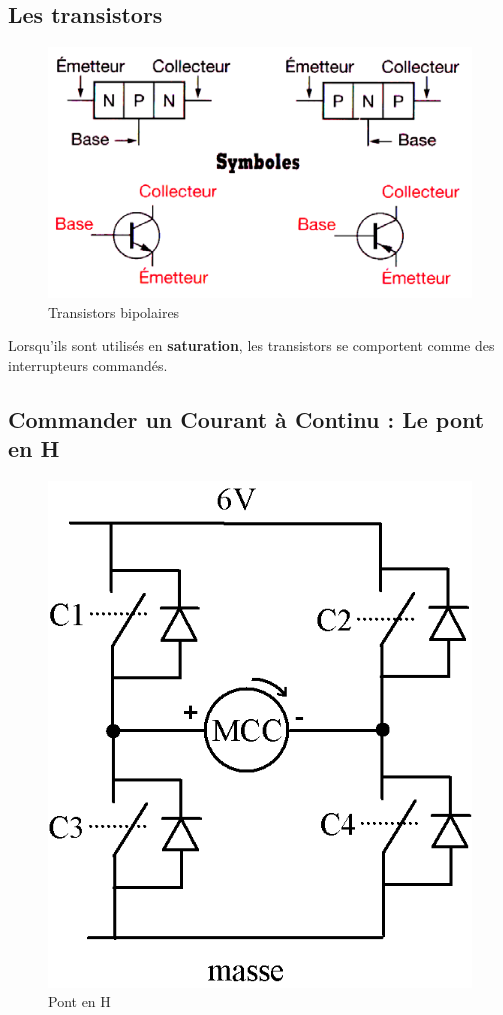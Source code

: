 \documentclass[10pt,fleqn]{article} %
\begin{document}
\subsection{Les transistors}
\begin{figure}
  \centering
  \includegraphics[width=.5\textwidth]{images/schema_transistor}
  \caption{Transistors bipolaires }
  \label{}
\end{figure}
\begin{aretenir}
  Lorsqu'ils sont utilisés en \textbf{saturation}, les transistors se comportent comme des interrupteurs commandés.
\end{aretenir}

\subsection{Commander un Courant à Continu : Le pont en H}

\begin{figure}[h]
  \centering
  \includegraphics[height=.35\textheight]{images/pontH}
  \caption{Pont en H}
  \label{pont en H}
\end{figure}
\end{document}
